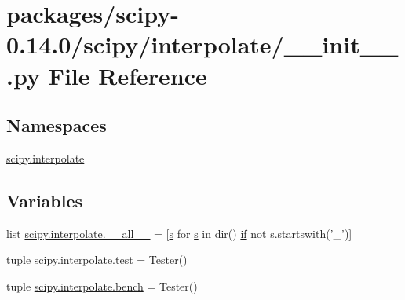 \hypertarget{packages_2scipy-0_814_80_2scipy_2interpolate_2____init_____8py}{}\section{packages/scipy-\/0.14.0/scipy/interpolate/\+\_\+\+\_\+init\+\_\+\+\_\+.py File Reference}
\label{packages_2scipy-0_814_80_2scipy_2interpolate_2____init_____8py}
\subsection*{Namespaces}
\begin{DoxyCompactItemize}
\item 
 \hyperlink{namespacescipy_1_1interpolate}{scipy.\+interpolate}
\end{DoxyCompactItemize}
\subsection*{Variables}
\begin{DoxyCompactItemize}
\item 
list \hyperlink{namespacescipy_1_1interpolate_a083c488e6f9e17b97923b2b404d877ed}{scipy.\+interpolate.\+\_\+\+\_\+all\+\_\+\+\_\+} = \mbox{[}\hyperlink{indexexpr_8h_ae024b0db549122b44c349ae28ec990dc}{s} for \hyperlink{indexexpr_8h_ae024b0db549122b44c349ae28ec990dc}{s} in dir() \hyperlink{minmax_8h_a30a0ee9fee303f01d9c5e6f669e0dfe9}{if} not s.\+startswith('\+\_\+')\mbox{]}
\item 
tuple \hyperlink{namespacescipy_1_1interpolate_a24e559174a07a5f61a756e1cf8c85238}{scipy.\+interpolate.\+test} = Tester()
\item 
tuple \hyperlink{namespacescipy_1_1interpolate_a6d49ea9757d79c91d1d8df0b91e7b3d2}{scipy.\+interpolate.\+bench} = Tester()
\end{DoxyCompactItemize}
